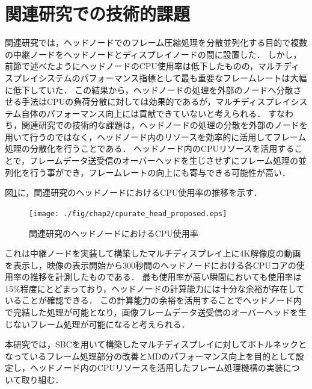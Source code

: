  \section{関連研究での技術的課題}
関連研究では，ヘッドノードでのフレーム圧縮処理を分散並列化する目的で複数の中継ノードをヘッドノードとディスプレイノードの間に設置した．
しかし，前節で述べたようにヘッドノードのCPU使用率は低下したものの，マルチディスプレイシステムのパフォーマンス指標として最も重要なフレームレートは大幅に低下していた．
この結果から，ヘッドノードの処理を外部のノードへ分散させる手法はCPUの負荷分散に対しては効果的であるが，マルチディスプレイシステム自体のパフォーマンス向上には貢献できていないと考えられる．
すなわち，関連研究での技術的な課題は，ヘッドノードの処理の分散を外部のノードを用いて行うのではなく，ヘッドノード内のリソースを効率的に活用してフレーム処理の分散化を行うことである．
ヘッドノード内のCPUリソースを活用することで，フレームデータ送受信のオーバーヘッドを生じさせずにフレーム処理の並列化を行う事ができ，フレームレートの向上にも寄与できる可能性が高い．

図\ref{cpuusage}に，関連研究のヘッドノードにおけるCPU使用率の推移を示す．

\begin{figure}[H]
  \hspace*{\fill}
  \texttt{[image: ./fig/chap2/cpurate\_head\_proposed.eps]}
  \hspace*{\fill}
  \caption{関連研究のヘッドノードにおけるCPU使用率}
  \label{cpuusage}
 \end{figure}

これは中継ノードを実装して構築したマルチディスプレイ上に4K解像度の動画を表示し，映像の表示開始から300秒間のヘッドノードにおける各CPUコアの使用率の推移を計測したものである．
最も使用率が高い瞬間においても使用率は15\%程度にとどまっており，ヘッドノードの計算能力には十分な余裕が存在していることが確認できる．
この計算能力の余裕を活用することでヘッドノード内で完結した処理が可能となり，画像フレームデータ送受信のオーバーヘッドを生じないフレーム処理が可能になると考えられる．

本研究では，SBCを用いて構築したマルチディスプレイに対してボトルネックとなっているフレーム処理部分の改善とMDのパフォーマンス向上を目的として設定し，ヘッドノード内のCPUリソースを活用したフレーム処理機構の実装について取り組む．


